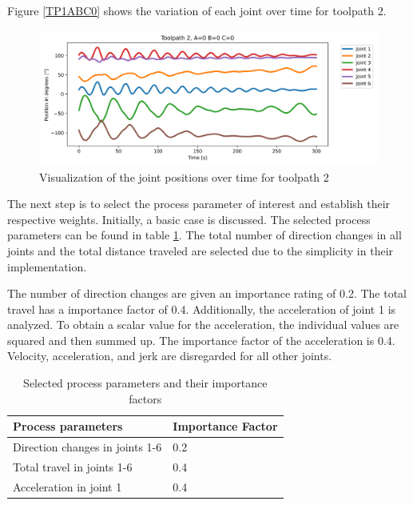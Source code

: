  Figure \ref{TP1ABC0} shows the variation of each joint over time for toolpath 2.
\begin{figure}[H]
	\centerline{\includegraphics[width=1\textwidth]{figures/TP2ABC0.png}}
	\caption{Visualization of the joint positions over time for toolpath 2}
	\label{TP2ABC0}
\end{figure}


The next step is to select the process parameter of interest and establish their respective weights. Initially, a basic case is discussed. The selected process parameters can be found in table \ref{PPbasic}. The total number of direction changes in all joints and the total distance traveled are selected due to the simplicity in their implementation.

The number of direction changes are given an importance rating of 0.2.
The total travel has a importance factor of 0.4. Additionally, the acceleration of joint 1 is analyzed. To obtain a scalar value for the acceleration, the individual values are squared and then summed up. The importance factor of the acceleration is 0.4.
Velocity, acceleration, and jerk are disregarded for all other joints.

\begin{table}[H]
	\centering
	\begin{tabular}{||l|l||}
		Process parameters& Importance Factor \\
		\hline
		\hline
		\hline
		Direction changes in joints 1-6	&		0.2 \\
		Total travel in joints 1-6	&  	0.4 \\
		Acceleration in joint 1	& 		0.4\\
		
		\hline
		\hline
	\end{tabular}
	
	\caption{Selected process parameters and their importance factors}
	\label{PPbasic}
\end{table}


